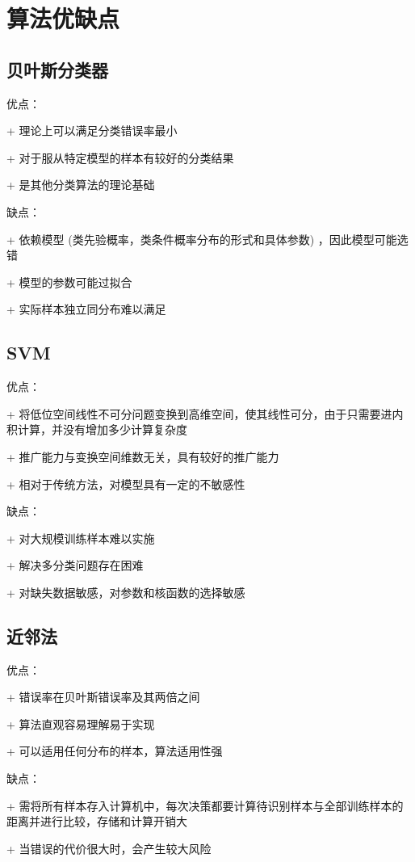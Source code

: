 \documentclass[openany,a4paper,12pt]{ctexbook}
\theoremstyle{kaiti}
\theoremstyle{normal}
\begin{document}
\chapter{算法优缺点}

\section{贝叶斯分类器}

优点：

+ 理论上可以满足分类错误率最小

+ 对于服从特定模型的样本有较好的分类结果

+ 是其他分类算法的理论基础

缺点：

+ 依赖模型 (类先验概率，类条件概率分布的形式和具体参数) ，因此模型可能选错

+ 模型的参数可能过拟合

+ 实际样本独立同分布难以满足

\section{SVM}

优点：

+ 将低位空间线性不可分问题变换到高维空间，使其线性可分，由于只需要进内积计算，并没有增加多少计算复杂度

+ 推广能力与变换空间维数无关，具有较好的推广能力

+ 相对于传统方法，对模型具有一定的不敏感性

缺点：

+ 对大规模训练样本难以实施

+ 解决多分类问题存在困难

+ 对缺失数据敏感，对参数和核函数的选择敏感

\section{近邻法}

优点：

+ 错误率在贝叶斯错误率及其两倍之间

+ 算法直观容易理解易于实现

+ 可以适用任何分布的样本，算法适用性强

缺点：

+ 需将所有样本存入计算机中，每次决策都要计算待识别样本与全部训练样本的距离并进行比较，存储和计算开销大

+ 当错误的代价很大时，会产生较大风险
\end{document}
